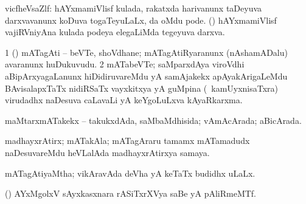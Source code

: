 \bentry
{} 
\gl{\nA}
\bmng
vicfheVsaZlf: 
\banum
{} hAYxmamiVlisf kulada, rakatxda harivanunx taDeyuva darxvavanunx koDuva togaTeyuLaLx, \ame da oMdu pode. 
 (\kanmu) hAYxmamiVlisf vajiRVniyAna kulada podeya elegaLiMda tegeyuva darxva. 
\eanum
\emng
\eentry

\bentry
{} 
\gl{\nA}
\expl{}
\bmng
\bnum
\num{1} (\ca) mATagAti -- beVTe, shoVdhane; mATagAtiRyaranunx (nAshamADalu) avaranunx huDukuvudu. 
\num{2} mATabeVTe; saMparxdAya viroVdhi aBipArxyagaLanunx hiDidiruvareMdu yA samAjakekx apAyakArigaLeMdu BAvisalapxTaTx nidiRSaTx vayxkitxya yA guMpina (\kanmu\ kamUyxnisaTxra) virudadhx naDesuva caLavaLi yA keYgoLuLxva kAyaRkarxma. 
\enum
\emng
\eentry

\bentry
{} 
\gl{\gu}
\expl{}
\bmng
maMtarxmATakekx -- takukxdAda, saMbaMdhisida; vAmAcArada; aBicArada. 
\emng
\eentry

\bentry
{} 
\gl{\nA}
\expl{}
\bmng
madhayxrAtirx; mATakAla; mATagAraru tamamx mATamadudx naDesuvareMdu heVLalAda madhayxrAtirxya samaya. 
\emng
\eentry

\bentry
{} 
\gl{\gu}
\expl{}
\bmng
mATagAtiyaMtha; vikAravAda deVha yA keTaTx budidhx uLaLx. 
\emng
\eentry

\bentry
{} 
\gl{\nA}
\expl{}
\bmng
(\ca) AYxMgolxV sAyxkasxnara rASiTxrXVya saBe yA pAliRmeMTf. 
\emng
\eentry

